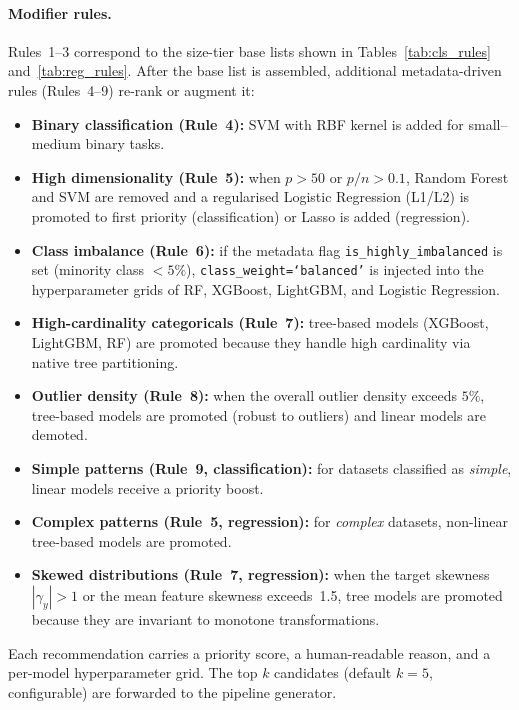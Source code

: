 \documentclass[conference]{IEEEtran}
\begin{document}
   \paragraph{Modifier rules.}
   Rules~1--3 correspond to the size-tier base lists shown in Tables~\ref{tab:cls_rules} and~\ref{tab:reg_rules}.
   After the base list is assembled, additional metadata-driven rules (Rules~4--9) re-rank or augment it:

   \begin{itemize}
   \item \textbf{Binary classification (Rule~4):} SVM with RBF kernel is added for small--medium binary tasks.
   \item \textbf{High dimensionality (Rule~5):} when $p>50$ or $p/n>0.1$, Random Forest and SVM are removed and a regularised Logistic Regression (L1/L2) is promoted to first priority (classification) or Lasso is added (regression).
   \item \textbf{Class imbalance (Rule~6):} if the metadata flag \texttt{is\_highly\_imbalanced} is set (minority class $<5\%$), \texttt{class\_weight=`balanced'} is injected into the hyperparameter grids of RF, XGBoost, LightGBM, and Logistic Regression.
   \item \textbf{High-cardinality categoricals (Rule~7):} tree-based models (XGBoost, LightGBM, RF) are promoted because they handle high cardinality via native tree partitioning.
   \item \textbf{Outlier density (Rule~8):} when the overall outlier density exceeds $5\%$, tree-based models are promoted (robust to outliers) and linear models are demoted.
   \item \textbf{Simple patterns (Rule~9, classification):} for datasets classified as \emph{simple}, linear models receive a priority boost.
   \item \textbf{Complex patterns (Rule~5, regression):} for \emph{complex} datasets, non-linear tree-based models are promoted.
   \item \textbf{Skewed distributions (Rule~7, regression):} when the target skewness $|\gamma_y|>1$ or the mean feature skewness exceeds~1.5, tree models are promoted because they are invariant to monotone transformations.
   \end{itemize}

   Each recommendation carries a priority score, a human-readable reason, and a per-model hyperparameter grid.
   The top $k$ candidates (default $k=5$, configurable) are forwarded to the pipeline generator.
\end{document}

